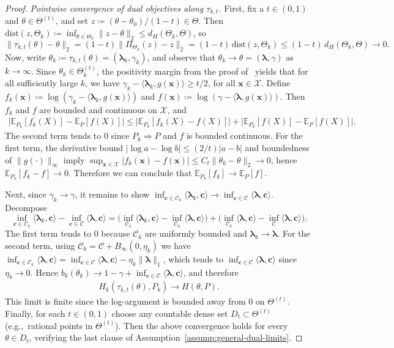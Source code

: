 \documentclass{article}
\theoremstyle{plain}
\theoremstyle{definition}
\newcommand{\calC}{\mathcal C}
\newcommand{\calX}{\mathcal X}
\newcommand{\cvec}{\mathbf{c}}
\newcommand{\xvec}{\mathbf{x}}
\newcommand{\boldlambda}{\boldsymbol{\lambda}}
\begin{document}
\begin{proof}
\emph{Pointwise convergence of dual objectives along $\tau_{k,t}$.}
First, fix a  $t\in(0,1)$ and $\theta\in\Theta^{(t)}$, and set $z\coloneqq (\theta-\theta_0)/(1-t)\in\Theta$. Then
$\mathrm{dist}(z,\Theta_k) \coloneqq \inf_{\theta \in \Theta_k} \|z - \theta\|_2 \le d_H(\Theta_k,\Theta)$, so
\[
\|\tau_{k,t}(\theta)-\theta\|_2
=(1-t)\|\Pi_{\Theta_k}(z)-z\|_2
=(1-t)\,\mathrm{dist}(z,\Theta_k)
\le (1-t)\,d_H(\Theta_k,\Theta)\to 0.
\]
Now,  write $\theta_k \coloneqq \tau_{k,t}(\theta)=(\boldlambda_k,\gamma_k)$, and observe that  $\theta_k\to\theta=(\boldlambda,\gamma)$ as $k \to \infty$.
Since $\theta_k\in\Theta_k^{(t)}$, the positivity margin from the proof of~ yields that for all sufficiently large $k$, we have  $\gamma_k-\langle \boldlambda_k,g(\xvec)\rangle \ge t/2$, for all $\xvec\in\calX$.
Define $f_k(\xvec)\coloneqq \log(\gamma_k-\langle \boldlambda_k,g(\xvec)\rangle)$ and $f(\xvec)\coloneqq \log(\gamma-\langle \boldlambda,g(\xvec)\rangle)$.
Then $f_k$ and $f$ are bounded and continuous on $\calX$, and
\begin{align}
\big|\mathbb{E}_{P_k}[f_k(X)]-\mathbb{E}_P[f(X)]\big|
\leq \big|\mathbb{E}_{P_k}[f_k(X)-f(X)]\big| + \big|\mathbb{E}_{P_k}[f(X)]-\mathbb{E}_P[f(X)]\big|.
\end{align}
The second term tends to $0$ since $P_k\Rightarrow P$ and $f$ is bounded continuous. For the first term, the derivative bound $|\log a-\log b|\leq (2/t)|a-b|$ and boundedness of $\|g(\cdot)\|_\infty$ imply $\sup_{\xvec\in\calX}|f_k(\xvec)-f(\xvec)| \leq C_t\|\theta_k-\theta\|_2 \to 0$, hence $\mathbb{E}_{P_k}[f_k-f]\to 0$. Therefore we can conclude that $\mathbb{E}_{P_k}[f_k]\to \mathbb{E}_P[f]$.

Next, since $\gamma_k\to\gamma$, it remains to show
$\inf_{\cvec\in\calC_k}\langle \boldlambda_k,\cvec\rangle \to \inf_{\cvec\in\calC}\langle \boldlambda,\cvec\rangle$.
Decompose
\[
\inf_{\cvec\in\calC_k}\langle \boldlambda_k,\cvec\rangle - \inf_{\cvec\in\calC}\langle \boldlambda,\cvec\rangle
=
\Big(\inf_{\calC_k}\langle \boldlambda_k,\cvec\rangle-\inf_{\calC_k}\langle \boldlambda,\cvec\rangle\Big)
+
\Big(\inf_{\calC_k}\langle \boldlambda,\cvec\rangle-\inf_{\calC}\langle \boldlambda,\cvec\rangle\Big).
\]
The first term tends to $0$ because $\calC_k$ are uniformly bounded and $\boldlambda_k\to\boldlambda$.
For the second term, using $\calC_k=\calC+B_\infty(0,\eta_k)$ we have
$\inf_{\cvec\in\calC_k}\langle \boldlambda,\cvec\rangle=\inf_{\cvec\in\calC}\langle \boldlambda,\cvec\rangle-\eta_k\|\boldlambda\|_1$,
which tends to $\inf_{\cvec\in\calC}\langle \boldlambda,\cvec\rangle$ since $\eta_k\to 0$.
Hence $b_k(\theta_k)\to 1-\gamma+\inf_{\cvec\in\calC}\langle \boldlambda,\cvec\rangle$, and therefore
\begin{align}
H_k(\tau_{k,t}(\theta),P_k)\to H(\theta,P).
\end{align}
This limit is finite since the log-argument is bounded away from $0$ on $\Theta^{(t)}$. Finally, for each $t\in(0,1)$ choose any countable dense set $D_t\subset\Theta^{(t)}$ (e.g.,\ rational points in $\Theta^{(t)}$). Then the above convergence holds for every $\theta\in D_t$, verifying the last clause of Assumption~\ref{assump:general-dual-limits}.
\end{proof}
\end{document}
